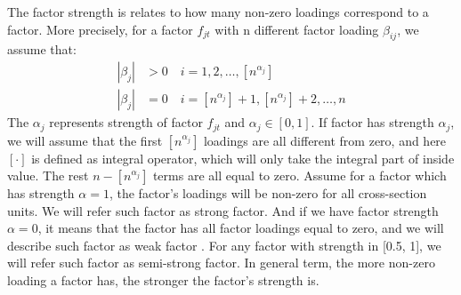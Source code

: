 \documentclass[12pt]{article}
\begin{document}
The factor strength is relates to how many non-zero loadings correspond to a factor.
More precisely, for a factor $f_{jt}$ with n different factor loading $\beta_{ij}$, we assume that:
\begin{align*}
|\beta_{j}| &> 0\quad i = 1, 2,  \dots, [n^{\alpha_j}]\\
|\beta_{j}| &= 0 \quad i = [n^{\alpha_j}] + 1, [n^{\alpha_j}] +2 ,\dots, n
\end{align*}
The $\alpha_j$ represents strength of factor $f_{jt}$ and $\alpha_j \in [0,1]$.
If factor has strength $\alpha_j$, we will assume that the first $[n^{\alpha_j}]$ loadings are all different from zero, and here $[\cdot] $  is defined as integral operator, which will only take the integral part of inside value.%
The rest $n - [n^{\alpha_j}]$ terms are all equal to zero. %
Assume for a factor which has strength $\alpha = 1$, the factor's loadings will be non-zero for all cross-section units.
We will refer such factor as strong factor.
And if we have factor strength $\alpha = 0$, it means that the factor has all factor loadings equal to zero, and we will describe such factor as weak factor \cite{Bailey2016}.
For any factor with strength in [0.5, 1], we will refer such factor as semi-strong factor.
In general term, the more non-zero loading a factor has, the stronger the factor's strength is. 




\end{document}
